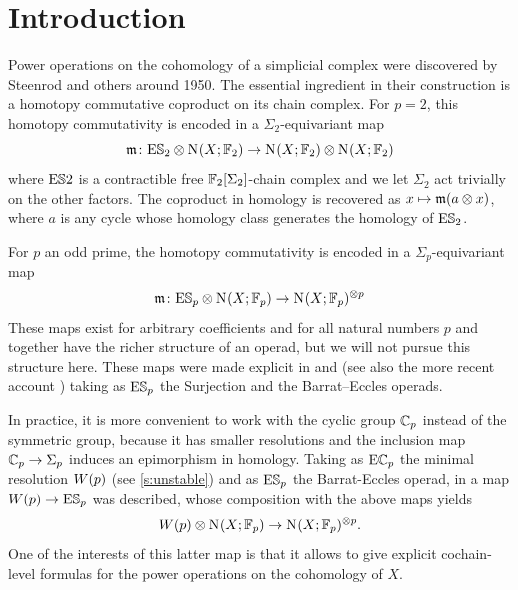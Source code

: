 
\section{Introduction}\label{s:introduction}

Power operations on the cohomology of a simplicial complex were discovered by Steenrod and others around 1950. The essential ingredient in their construction is a homotopy commutative coproduct on its chain complex. For $p=2$, this homotopy commutativity is encoded in a $\Sigma_2$-equivariant map
\begin{equation}\label{eq:st2}
	\mathfrak{m}\colon \mathrm{E}\mathbb{S}_2\otimes \operatorname{N}_{}(X;\mathbb{F}_2)\to \operatorname{N}_{}(X;\mathbb{F}_2)\otimes \operatorname{N}_{}(X;\mathbb{F}_2)
\end{equation}
where $\mathrm{E}\mathbb{S}2$ is a contractible free $\mathbb{F}_2[\Sigma_2]$-chain complex and we let $\Sigma_2$ act trivially on the other factors. The coproduct in homology is recovered as $x\mapsto \mathfrak{m}(a\otimes x)$, where $a$ is any cycle whose homology class generates the homology of $\mathrm{E}\mathbb{S}_2$.

For $p$ an odd prime, the homotopy commutativity is encoded in a $\Sigma_p$-equivariant map
\begin{equation}\label{eq:stp}
	\mathfrak{m}\colon \mathrm{E}\mathbb{S}_p\otimes \operatorname{N}_{}(X;\mathbb{F}_p)\to \operatorname{N}_{}(X;\mathbb{F}_p)^{\otimes p}
\end{equation}
These maps exist for arbitrary coefficients and for all natural numbers $p$ and together have the richer structure of an operad, but we will not pursue this structure here. These maps were made explicit in \cite{mcclure2003multivariable} and \cite{berger2004combinatorial} (see also the more recent account \cite{brumfiel2023explicit}) taking as $\mathrm{E}\mathbb{S}_p$ the Surjection and the Barrat--Eccles operads. 

In practice, it is more convenient to work with the cyclic group $\mathbb{C}_p$ instead of the symmetric group, because it has smaller resolutions and the inclusion map $\mathbb{C}_p\to \Sigma_p$ induces an epimorphism in homology. Taking as $\mathrm{E}\mathbb{C}_p$ the minimal resolution $W(p)$ (see \cref{s:unstable}) and as $\mathrm{E}\mathbb{S}_p$ the Barrat-Eccles operad, in \cite{medina2021may_st} a map $W(p)\to \mathrm{E}\mathbb{S}_p$ was described, whose composition with the above maps yields
\[
	W(p)\otimes \operatorname{N}_{}(X;\mathbb{F}_p)\to \operatorname{N}_{}(X;\mathbb{F}_p)^{\otimes p}.
\]
One of the interests of this latter map is that it allows to give explicit cochain-level formulas for the power operations on the cohomology of $X$.
 
